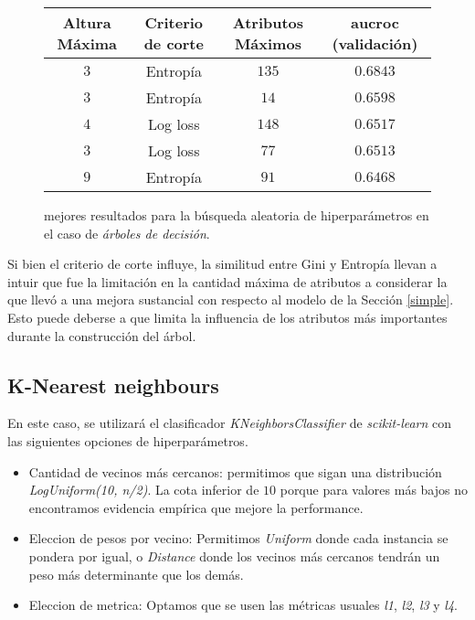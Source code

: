 \vspace{0.5em}
\begin{figure}[!htbp]
    \begin{center}
        \begin{tabular}{ |c|c|c|c| } 
         \hline
        Altura Máxima   & Criterio de corte & Atributos Máximos  & aucroc (validación) \\
        \hline
        $3$             & Entropía          &  $135$            & $0.6843$  \\ 
        $3$             & Entropía          &  $14$             & $0.6598$  \\
        $4$             & Log loss          &  $148$            & $0.6517$  \\ 
        $3$             & Log loss          &  $77$             & $0.6513$  \\
        $9$             & Entropía          &  $91$             & $0.6468$  \\ 
        \hline
        \end{tabular}
    \end{center}
    \caption{mejores resultados para la búsqueda aleatoria de hiperparámetros en el caso de \textit{árboles de decisión}.} \label{random_tree}
\end{figure}

Si bien el criterio de corte influye, la similitud entre Gini y Entropía llevan a intuir que fue la limitación en la cantidad máxima de atributos a considerar la que llevó a una mejora sustancial con respecto al modelo de la Sección \ref{simple}. Esto puede deberse a que limita la influencia de los atributos más importantes durante la construcción del árbol.

\subsection{K-Nearest neighbours}
En este caso, se utilizará el clasificador \textit{KNeighborsClassifier} de \textit{scikit-learn} con las siguientes opciones de hiperparámetros.

\begin{itemize}
    \item Cantidad de vecinos más cercanos: permitimos que sigan una distribución \textit{LogUniform(10, n/2)}. La cota inferior de $10$ porque para valores más bajos no encontramos evidencia empírica que mejore la performance. 
    \item Eleccion de pesos por vecino: Permitimos \textit{Uniform} donde cada instancia se pondera por igual, o \textit{Distance} donde los vecinos más cercanos tendrán un peso más determinante que los demás.
    \item Eleccion de metrica: Optamos que se usen las métricas usuales \textit{l1}, \textit{l2}, \textit{l3} y \textit{l4}. 
\end{itemize}

